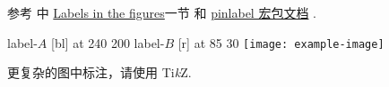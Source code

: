 参考 \cite{wiki:floats} 中 \href{https://en.wikibooks.org/wiki/LaTeX/Floats,\_Figures\_and\_Captions\#Labels\_in\_the\_figures}{Labels in the figures}一节 和 \href{http://mirrors.ctan.org/macros/latex/contrib/pinlabel/pinlabdoc.pdf}{pinlabel 宏包文档} \cite{pinlabel}.
\begin{vertlst}

\hair 2pt
\pinlabel label-$A$ [bl] at 240 200
\pinlabel label-$B$ [r] at 85 30
\endlabellist
\centering
\texttt{[image: example-image]}
\end{vertlst}
更复杂的图中标注，请使用 Ti\emph{k}Z.